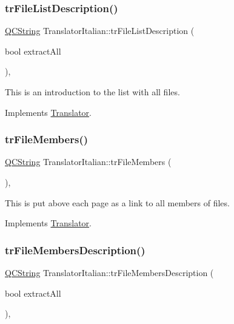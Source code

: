 \subsubsection{\texorpdfstring{trFileListDescription()}{trFileListDescription()}}
{\footnotesize\ttfamily \mbox{\hyperlink{class_q_c_string}{Q\+C\+String}} Translator\+Italian\+::tr\+File\+List\+Description (\begin{DoxyParamCaption}\item[{bool}]{extract\+All }\end{DoxyParamCaption})\hspace{0.3cm}{\ttfamily [inline]}, {\ttfamily [virtual]}}

This is an introduction to the list with all files. 

Implements \mbox{\hyperlink{class_translator}{Translator}}.

\mbox{\label{class_translator_italian_a063f0ec757fea0803faac6701088ff81}} 
\subsubsection{\texorpdfstring{trFileMembers()}{trFileMembers()}}
{\footnotesize\ttfamily \mbox{\hyperlink{class_q_c_string}{Q\+C\+String}} Translator\+Italian\+::tr\+File\+Members (\begin{DoxyParamCaption}{ }\end{DoxyParamCaption})\hspace{0.3cm}{\ttfamily [inline]}, {\ttfamily [virtual]}}

This is put above each page as a link to all members of files. 

Implements \mbox{\hyperlink{class_translator}{Translator}}.

\mbox{\label{class_translator_italian_a090c735a3b7b71fbf12ef69ce137cfa5}} 
\subsubsection{\texorpdfstring{trFileMembersDescription()}{trFileMembersDescription()}}
{\footnotesize\ttfamily \mbox{\hyperlink{class_q_c_string}{Q\+C\+String}} Translator\+Italian\+::tr\+File\+Members\+Description (\begin{DoxyParamCaption}\item[{bool}]{extract\+All }\end{DoxyParamCaption})\hspace{0.3cm}{\ttfamily [inline]}, {\ttfamily [virtual]}}

